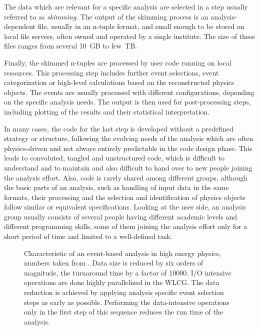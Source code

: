 \documentclass[3p]{elsarticle}
\begin{document}
The data which are relevant for a specific analysis are selected in a step usually referred to as \textit{skimming}.
The output of the skimming process is an analysis-dependent file, usually in an n-tuple format, and small enough to be stored on local file servers, often owned and operated by a single institute.
The size of these files ranges from several \SI{10}{GB} to few~TB.

Finally, the skimmed n-tuples are processed by user code running on local resources.
This processing step includes further event selections, event categorization or high-level calculations based on the reconstructed physics objects.
The events are usually processed with different configurations, depending on the specific analysis needs.
The output is then used for post-processing steps, including plotting of the results and their statistical interpretation.

In many cases, the code for the last step is developed without a predefined strategy or structure, following the evolving needs of the analysis which are often physics-driven and not always entirely predictable in the code design phase.
This leads to convoluted, tangled and unstructured code, which is difficult to understand and to maintain and also difficult to hand over to new people joining the analysis effort.
Also, code is rarely shared among different groups, although the basic parts of an analysis, such as handling of input data in the same formats, their processing and the selection and identification of physics objects follow similar or equivalent specifications.
Looking at the user side, an analysis group usually consists of several people having different academic levels and different programming skills, some of them joining the analysis effort only for a short period of time and limited to a well-defined task.

\begin{figure}[t]
\centering 
\caption[Characteristics of an event-based analysis in high energy physics]{Characteristic of an event-based analysis in high energy physics, numbers taken from \cite{joram_phd}.
Data size is reduced by six orders of magnitude, the turnaround time by a factor of 10000.
I/O intensive operations are done highly parallelized in the WLCG.
The data reduction is achieved by applying analysis specific event selection steps as early as possible.
Performing the data-intensive operations only in the first step of this sequence reduces the run time of the analysis.}
\label{figure_analysis_steps}
\end{figure}
\end{document}
